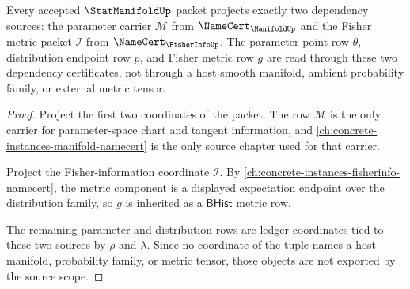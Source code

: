\begin{theorem}
\label{thm:statmanifold-fisher-manifold-source-scope}
Every accepted $\StatManifoldUp$ packet projects exactly two dependency
sources: the parameter carrier $\mathcal{M}$ from $\NameCert_{\ManifoldUp}$
and the Fisher metric packet $\mathcal{I}$ from
$\NameCert_{\FisherInfoUp}$. The parameter point row $\theta$, distribution
endpoint row $p$, and Fisher metric row $g$ are read through these two
dependency certificates, not through a host smooth manifold, ambient
probability family, or external metric tensor.
\end{theorem}

\begin{proof}
Project the first two coordinates of the packet. The row $\mathcal{M}$ is the
only carrier for parameter-space chart and tangent information, and
\autoref{ch:concrete-instances-manifold-namecert} is the only source chapter
used for that carrier.

Project the Fisher-information coordinate $\mathcal{I}$. By
\autoref{ch:concrete-instances-fisherinfo-namecert}, the metric component is a
displayed expectation endpoint over the distribution family, so $g$ is
inherited as a $\mathsf{BHist}$ metric row.

The remaining parameter and distribution rows are ledger coordinates tied to
these two sources by $\rho$ and $\lambda$. Since no coordinate of the tuple
names a host manifold, probability family, or metric tensor, those objects are
not exported by the source scope.
\end{proof}

